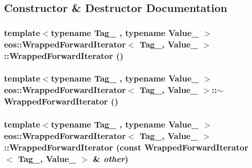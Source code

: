 \subsection{Constructor \& Destructor Documentation}
\hypertarget{classeos_1_1WrappedForwardIterator_a321ac3c98ae28956b7428b193e6f65ba}{
\subsubsection[{WrappedForwardIterator}]{\setlength{\rightskip}{0pt plus 5cm}template$<$typename Tag\_\- , typename Value\_\- $>$ {\bf eos::WrappedForwardIterator}$<$ Tag\_\-, Value\_\- $>$::{\bf WrappedForwardIterator} ()}}
\label{classeos_1_1WrappedForwardIterator_a321ac3c98ae28956b7428b193e6f65ba}
\hypertarget{classeos_1_1WrappedForwardIterator_a4694e3a609d50263eff28cf49c6359c0}{
\subsubsection[{$\sim$WrappedForwardIterator}]{\setlength{\rightskip}{0pt plus 5cm}template$<$typename Tag\_\- , typename Value\_\- $>$ {\bf eos::WrappedForwardIterator}$<$ Tag\_\-, Value\_\- $>$::$\sim${\bf WrappedForwardIterator} ()}}
\label{classeos_1_1WrappedForwardIterator_a4694e3a609d50263eff28cf49c6359c0}
\hypertarget{classeos_1_1WrappedForwardIterator_af824e052467ced345fdc2391bf251e34}{
\subsubsection[{WrappedForwardIterator}]{\setlength{\rightskip}{0pt plus 5cm}template$<$typename Tag\_\- , typename Value\_\- $>$ {\bf eos::WrappedForwardIterator}$<$ Tag\_\-, Value\_\- $>$::{\bf WrappedForwardIterator} (const {\bf WrappedForwardIterator}$<$ Tag\_\-, Value\_\- $>$ \& {\em other})}}
